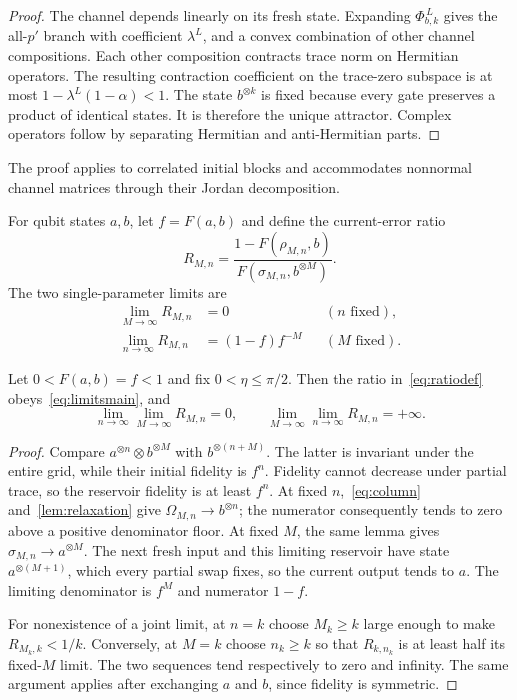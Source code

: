 \begin{proof}
The channel depends linearly on its fresh state. Expanding $\Phi_{b,k}^{\,L}$ gives the all-$p'$ branch with coefficient $\lambda^L$, and a convex combination of other channel compositions. Each other composition contracts trace norm on Hermitian operators. The resulting contraction coefficient on the trace-zero subspace is at most $1-\lambda^L(1-\alpha)<1$. The state $b^{\otimes k}$ is fixed because every gate preserves a product of identical states. It is therefore the unique attractor. Complex operators follow by separating Hermitian and anti-Hermitian parts.
\end{proof}

The proof applies to correlated initial blocks and accommodates nonnormal channel matrices through their Jordan decomposition.


For qubit states $a,b$, let $f=F(a,b)$ and define the current-error ratio
\begin{equation}
 R_{M,n}=\frac{1-F(\rho_{M,n},b)}{F(\sigma_{M,n},b^{\otimes M})}.
 \label{eq:ratiodef}
\end{equation}
The two single-parameter limits are
\begin{align}
 \lim_{M\to\infty}R_{M,n}&=0 &&(n\text{ fixed}),\nonumber\\
 \lim_{n\to\infty}R_{M,n}&=(1-f)f^{-M} &&(M\text{ fixed}).
 \label{eq:limitsmain}
\end{align}
\begin{theorem}\label{thm:limits}
Let $0<F(a,b)=f<1$ and fix $0<\eta\le\pi/2$. Then the ratio in~\eqref{eq:ratiodef} obeys~\eqref{eq:limitsmain}, and
\begin{equation}
 \lim_{n\to\infty}\lim_{M\to\infty}R_{M,n}=0,
 \qquad
 \lim_{M\to\infty}\lim_{n\to\infty}R_{M,n}=+\infty.
 \label{eq:iterated}
\end{equation}
\end{theorem}
\begin{proof}
Compare $a^{\otimes n}\otimes b^{\otimes M}$ with $b^{\otimes(n+M)}$. The latter is invariant under the entire grid, while their initial fidelity is $f^n$. Fidelity cannot decrease under partial trace, so the reservoir fidelity is at least $f^n$. At fixed $n$,~\eqref{eq:column} and~\cref{lem:relaxation} give $\Omega_{M,n}\to b^{\otimes n}$; the numerator consequently tends to zero above a positive denominator floor. At fixed $M$, the same lemma gives $\sigma_{M,n}\to a^{\otimes M}$. The next fresh input and this limiting reservoir have state $a^{\otimes(M+1)}$, which every partial swap fixes, so the current output tends to $a$. The limiting denominator is $f^M$ and numerator $1-f$.

For nonexistence of a joint limit, at $n=k$ choose $M_k\ge k$ large enough to make $R_{M_k,k}<1/k$. Conversely, at $M=k$ choose $n_k\ge k$ so that $R_{k,n_k}$ is at least half its fixed-$M$ limit. The two sequences tend respectively to zero and infinity. The same argument applies after exchanging $a$ and $b$, since fidelity is symmetric.
\end{proof}

